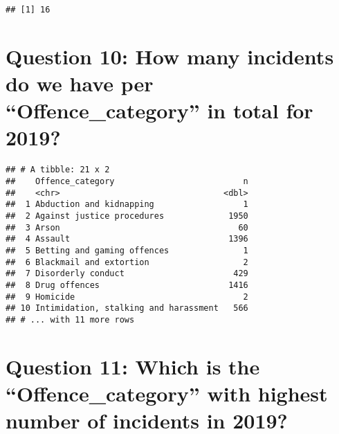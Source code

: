 \documentclass[
]{article}
\newenvironment{Shaded}{\begin{snugshade}}{\end{snugshade}}
\newcommand{\CommentTok}[1]{\textcolor[rgb]{0.56,0.35,0.01}{\textit{#1}}}
\newcommand{\DataTypeTok}[1]{\textcolor[rgb]{0.13,0.29,0.53}{#1}}
\newcommand{\KeywordTok}[1]{\textcolor[rgb]{0.13,0.29,0.53}{\textbf{#1}}}
\newcommand{\NormalTok}[1]{#1}
\newcommand{\OperatorTok}[1]{\textcolor[rgb]{0.81,0.36,0.00}{\textbf{#1}}}
\newcommand{\OtherTok}[1]{\textcolor[rgb]{0.56,0.35,0.01}{#1}}
\newcommand{\StringTok}[1]{\textcolor[rgb]{0.31,0.60,0.02}{#1}}
\begin{document}
\begin{verbatim}
## [1] 16
\end{verbatim}

\hypertarget{question-10-how-many-incidents-do-we-have-per-offence_category-in-total-for-2019}{%
\section{Question 10: How many incidents do we have per
``Offence\_category'' in total for
2019?}\label{question-10-how-many-incidents-do-we-have-per-offence_category-in-total-for-2019}}

\begin{Shaded}
\end{Shaded}

\begin{verbatim}
## # A tibble: 21 x 2
##    Offence_category                          n
##    <chr>                                 <dbl>
##  1 Abduction and kidnapping                  1
##  2 Against justice procedures             1950
##  3 Arson                                    60
##  4 Assault                                1396
##  5 Betting and gaming offences               1
##  6 Blackmail and extortion                   2
##  7 Disorderly conduct                      429
##  8 Drug offences                          1416
##  9 Homicide                                  2
## 10 Intimidation, stalking and harassment   566
## # ... with 11 more rows
\end{verbatim}

\hypertarget{question-11-which-is-the-offence_category-with-highest-number-of-incidents-in-2019}{%
\section{Question 11: Which is the ``Offence\_category'' with highest
number of incidents in
2019?}\label{question-11-which-is-the-offence_category-with-highest-number-of-incidents-in-2019}}

\begin{Shaded}
\end{Shaded}
\end{document}
